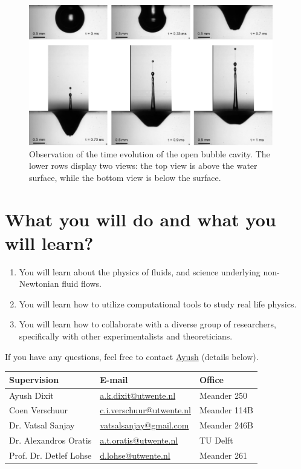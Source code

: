 \documentclass[a4paper,10pt]{article}
\begin{document}
\begin{figure}[H]
\begin{center}
 \includegraphics[width=0.95\textwidth]{schematic.pdf}
 \caption{Observation of the time evolution of the open bubble cavity. The lower rows display two views: the top view is above the water surface, while the bottom view is below the surface. }
 \label{Figure::Waves}
\end{center}
\end{figure}
\section*{What you will do and what you will learn?}
\begin{enumerate}
\item You will learn about the physics of fluids, and science underlying non-Newtonian fluid flows. 
\item You will learn how to utilize computational tools to study real life physics. 
\item You will learn how to collaborate with a diverse group of researchers, specifically with other experimentalists and theoreticians.

\end{enumerate}

If you have any questions, feel free to contact \href{mailto:a.k.dixit@utwente.nl}{Ayush} (details below).
\begin{center}
\begin{tabular}{|l|l|l|}
\hline \textbf{Supervision} & \textbf{E-mail} & \textbf{Office} \\
\hline Ayush Dixit & \href{mailto:a.k.dixit@utwente.nl}{a.k.dixit@utwente.nl} & Meander 250 \\
\hline Coen Verschuur & \href{mailto:c.i.verschuur@utwente.nl}{c.i.verschuur@utwente.nl} & Meander 114B \\
\hline Dr. Vatsal Sanjay & \href{mailto:vatsalsanjay@gmail.com}{vatsalsanjay@gmail.com} & Meander 246B \\
\hline Dr. Alexandros Oratis   & \href{mailto:a.t.oratis@utwente.nl}{a.t.oratis@utwente.nl}& TU Delft \\
\hline Prof. Dr. Detlef Lohse & \href{mailto:d.lohse@utwente.nl}{d.lohse@utwente.nl} & Meander 261  \\
\hline
\end{tabular}
\end{center}
\printbibliography
\end{document}
